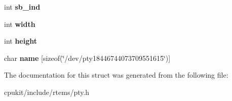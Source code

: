 \begin{DoxyCompactItemize}
int {\bfseries sb\+\_\+ind}
\item 
\mbox{\label{structrtems__pty__context_ad071fcef416d941555a2ace384b1ae68}} 
int {\bfseries width}
\item 
\mbox{\label{structrtems__pty__context_a3eebc8fd2c40435075d0858da89c2d4b}} 
int {\bfseries height}
\item 
\mbox{\label{structrtems__pty__context_a55bbf077a09727abab155236c7e1c23c}} 
char {\bfseries name} \mbox{[}sizeof(\char`\"{}/dev/pty18446744073709551615\char`\"{})\mbox{]}
\end{DoxyCompactItemize}


The documentation for this struct was generated from the following file\+:\begin{DoxyCompactItemize}
\item 
cpukit/include/rtems/pty.\+h\end{DoxyCompactItemize}
